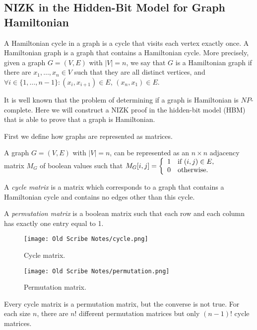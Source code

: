 \subsection{NIZK in the Hidden-Bit Model for  Graph Hamiltonian}

\begin{definition}
A Hamiltonian cycle in a graph is a cycle that visits each vertex exactly once. A Hamiltonian graph is a graph that contains a Hamiltonian cycle. More precisely, given a graph
$G=(V,E)$ with $|V|=n$, we say that $G$ is a Hamiltonian graph if there are
$x_1,\ldots,x_n\in V$ such that they are all distinct vertices, and $\forall i\in\{1,\ldots,n-1\} : (x_i,x_{i+1})\in E$,
$(x_n,x_1)\in E$.
\end{definition}


It is well known that the problem of determining if a graph is Hamiltonian is $NP$-complete.
Here we will construct a NIZK proof in the hidden-bit model (HBM) that is able to prove
that a graph is Hamiltonian.

First we define how graphs are represented as matrices.

\begin{definition}
A graph $G=(V,E)$ with $|V|=n$, can be represented as an $n\times n$ adjacency matrix $M_G$
of boolean values such that
$M_G[i,j]=\left\{
\begin{array}{l l}
1 & \text{if $(i,j)\in E$,} \\
0 & \text{otherwise.}
\end{array}
\right.$

A \emph{cycle matrix} is a matrix which corresponds to a graph that contains a Hamiltonian cycle and
contains no edges other than this cycle.

A \emph{permutation matrix} is a boolean matrix such that each row and each column has exactly one
entry equal to 1.
\end{definition}

\begin{figure}[ht]
	\centering
		\texttt{[image: Old Scribe Notes/cycle.png]}
	\caption{Cycle matrix.}
	\label{fig:cycle}
\end{figure}

\begin{figure}[ht]
	\centering
		\texttt{[image: Old Scribe Notes/permutation.png]}
	\caption{Permutation matrix.}
	\label{fig:permutation}
\end{figure}

Every cycle matrix is a permutation matrix, but the converse is not true.
For each size $n$, there are $n!$ different permutation matrices but
only $(n-1)!$ cycle matrices.

